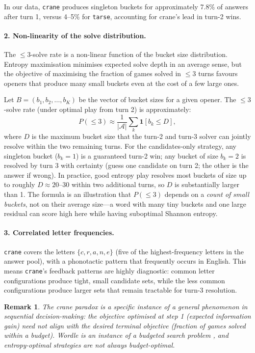 \documentclass{article}
\newtheorem{remark}{Remark}
\begin{document}
In our data, \texttt{crane} produces singleton buckets for approximately 7.8\%
of answers after turn 1, versus 4--5\% for \texttt{tarse}, accounting for
crane's lead in turn-2 wins.

\paragraph{2. Non-linearity of the solve distribution.}
The $\leq 3$-solve rate is a non-linear function of the bucket size distribution.
Entropy maximisation minimises expected solve depth in an average sense, but the
objective of maximising the fraction of games solved in $\leq 3$ turns favours
openers that produce many small buckets even at the cost of a few large ones.

Let $B = (b_1, b_2, \ldots, b_K)$ be the vector of bucket sizes for a given
opener. The $\leq 3$-solve rate (under optimal play from turn 2) is approximately:
\[
  P(\leq 3) \approx \frac{1}{|\mathcal{A}|} \sum_k \mathbf{1}[b_k \leq D],
\]
where $D$ is the maximum bucket size that the turn-2 and turn-3 solver can
jointly resolve within the two remaining turns. For the candidates-only strategy,
any singleton bucket ($b_k = 1$) is a guaranteed turn-2 win; any bucket of
size $b_k = 2$ is resolved by turn 3 with certainty (guess one candidate on
turn 2; the other is the answer if wrong). In practice, good entropy play
resolves most buckets of size up to roughly $D \approx 20$--$30$ within two
additional turns, so $D$ is substantially larger than 1. The formula is an
illustration that $P(\leq 3)$ depends on a \emph{count of small buckets},
not on their average size---a word with many tiny buckets and one large residual
can score high here while having suboptimal Shannon entropy.

\paragraph{3. Correlated letter frequencies.}
\texttt{crane} covers the letters $\{c, r, a, n, e\}$ (five of the
highest-frequency letters in the answer pool), with a phonotactic pattern that
frequently occurs in English. This means \texttt{crane}'s feedback patterns are
highly diagnostic: common letter configurations produce tight, small candidate sets,
while the less common configurations produce larger sets that remain tractable for
turn-3 resolution.

\begin{remark}
  The crane paradox is a specific instance of a general phenomenon in sequential
  decision-making: the objective optimised at step 1 (expected information gain)
  need not align with the desired terminal objective (fraction of games solved
  within a budget). Wordle is an instance of a budgeted search problem
  \citep{berlekamp1964block}, and entropy-optimal strategies are not always
  budget-optimal.
\end{remark}
\end{document}
